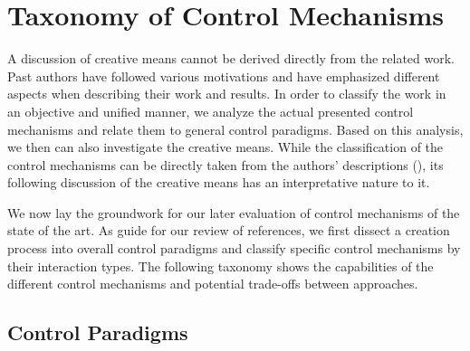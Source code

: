 

\section{Taxonomy of Control Mechanisms}
\label{sec:taxo_control_mechanism}





A discussion of creative means cannot be derived directly from the related work. Past authors have followed various motivations and have emphasized different aspects when describing their work and results. In order to classify the work in an objective and unified manner, we analyze the actual presented control mechanisms and relate them to general control paradigms. Based on this analysis, we then can also investigate the creative means. While the classification of the control mechanisms can be directly taken from the authors' descriptions (), its following discussion of the creative means has an interpretative nature to it. 

We now lay the groundwork for our later evaluation of control mechanisms of the state of the art. As guide for our review of references, we first dissect a creation process into overall control paradigms and classify specific control mechanisms by their interaction types. The following taxonomy shows the capabilities of the different control mechanisms and potential trade-offs between approaches.  

\newcommand{\controlParamsFigWidth}{1.0}

\subsection{Control Paradigms}

